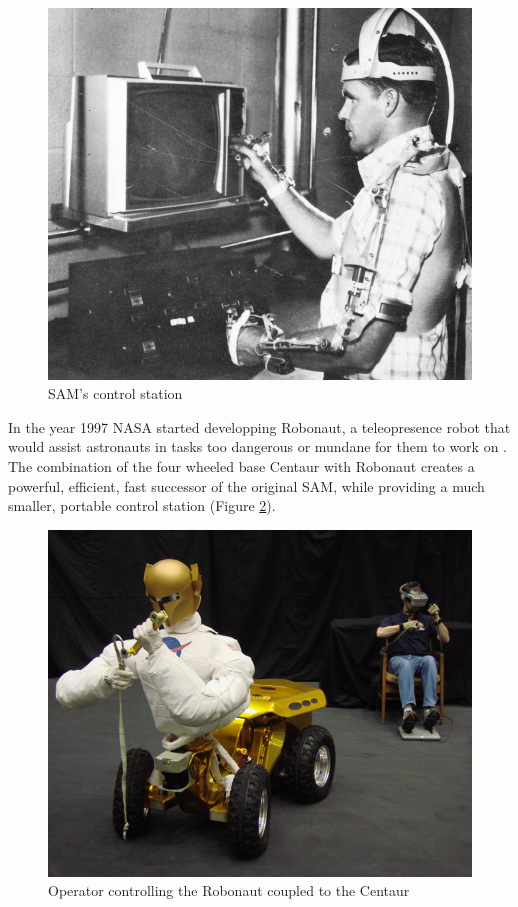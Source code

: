 	\begin{figure}[H]
			\centering
			\includegraphics[scale=2]{images/StateOfArt/SAM2.jpg}
			\caption{SAM's control station }
			\label{sam2}
	\end{figure}
	
In the year 1997 NASA started developping Robonaut, a teleopresence robot that would assist astronauts in tasks too dangerous or mundane for them to work on\cite{robonaut2} \cite{robonaut3}. The combination of the four wheeled base Centaur with Robonaut creates a powerful, efficient, fast successor of the original SAM, while providing a much smaller, portable control station (Figure \ref{robonaut}).

	\begin{figure}[H]
			\centering
			\includegraphics[scale=0.55]{images/StateOfArt/robonaut.jpg}
			\caption{Operator controlling the Robonaut coupled to the Centaur}
			\label{robonaut}
	\end{figure}
	\bigskip 

